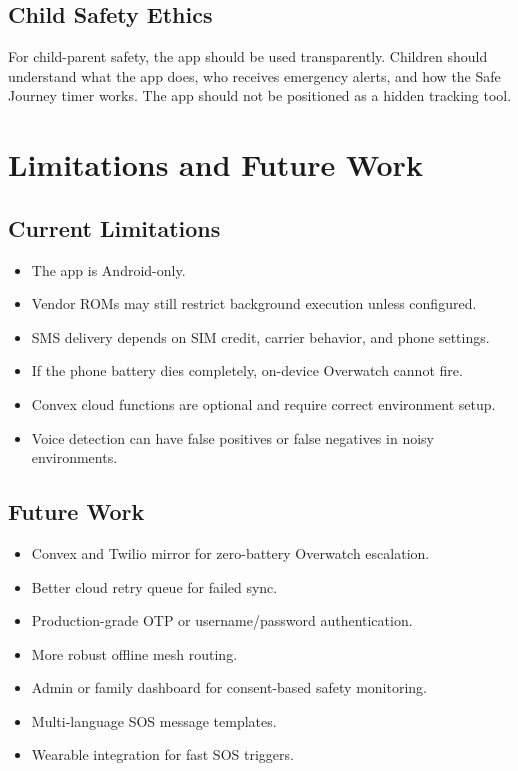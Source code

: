 \documentclass[12pt,a4paper]{report}
\begin{document}
\section{Child Safety Ethics}

For child-parent safety, the app should be used transparently. Children should understand what the app does, who receives emergency alerts, and how the Safe Journey timer works. The app should not be positioned as a hidden tracking tool.

\chapter{Limitations and Future Work}

\section{Current Limitations}

\begin{itemize}
    \item The app is Android-only.
    \item Vendor ROMs may still restrict background execution unless configured.
    \item SMS delivery depends on SIM credit, carrier behavior, and phone settings.
    \item If the phone battery dies completely, on-device Overwatch cannot fire.
    \item Convex cloud functions are optional and require correct environment setup.
    \item Voice detection can have false positives or false negatives in noisy environments.
\end{itemize}

\section{Future Work}

\begin{itemize}
    \item Convex and Twilio mirror for zero-battery Overwatch escalation.
    \item Better cloud retry queue for failed sync.
    \item Production-grade OTP or username/password authentication.
    \item More robust offline mesh routing.
    \item Admin or family dashboard for consent-based safety monitoring.
    \item Multi-language SOS message templates.
    \item Wearable integration for fast SOS triggers.
\end{itemize}
\end{document}
